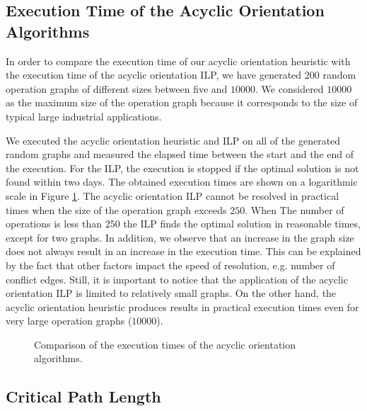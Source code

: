\subsection{Execution Time of the Acyclic Orientation Algorithms}

In order to compare the execution time of our acyclic orientation heuristic with the execution time of the acyclic orientation ILP, we have generated 200 random operation graphs of different sizes between five and $10000$. %
We considered $10000$ as the maximum size of the operation graph because it corresponds to the size of typical large industrial applications. 

We executed the acyclic orientation heuristic and ILP on all of the generated random graphs and measured the elapsed time between the start and the end of the execution. For the ILP, the execution is stopped if the optimal solution is not found within two days. The obtained execution times are shown on a logarithmic scale in Figure \ref{fig:orient_exec}. The acyclic orientation ILP cannot be resolved in practical times when the size of the operation graph exceeds $250$. When The number of operations is less than $250$ the ILP finds the optimal solution in reasonable times, except for two graphs. In addition, we observe that an increase in the graph size does not always result in an increase in the execution time. This can be explained by the fact that other factors impact the speed of resolution, e.g. number of conflict edges. Still, it is important to notice that the application of the acyclic orientation ILP is limited to relatively small graphs. On the other hand, the acyclic orientation heuristic produces results in practical execution times even for very large operation graphs ($10000$).

\begin{figure}[phbt]
\centering

\caption{Comparison of the execution times of the acyclic orientation algorithms.}
\label{fig:orient_exec}
\end{figure} 
 
\subsection{Critical Path Length}

